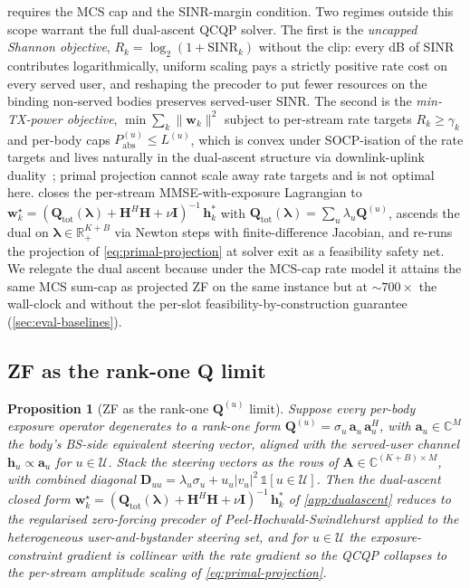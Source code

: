 \documentclass[journal,twocolumn,10pt]{IEEEtran}
\theoremstyle{plain}
\newtheorem{proposition}[theorem]{Proposition}
\theoremstyle{remark}
\newcommand{\hh}{\mathbf{h}}
\newcommand{\ww}{\mathbf{w}}
\newcommand{\Pabs}{P_{\mathrm{abs}}}
\newcommand{\Qmat}{\mathbf{Q}}
\newcommand{\HH}{\mathbf{H}}
\newcommand{\II}{\mathbf{I}}
\newcommand{\Complex}{\mathbb{C}}
\newcommand{\Served}{\mathcal{U}}
\begin{document}
 requires the MCS cap and the
SINR-margin condition. Two regimes outside this scope warrant the
full dual-ascent QCQP solver. The first is the
\emph{uncapped Shannon objective}, $R_k = \log_2(1 +
\mathrm{SINR}_k)$ without the clip: every dB of SINR contributes
logarithmically, uniform scaling pays a strictly positive rate cost
on every served user, and reshaping the precoder to put fewer
resources on the binding non-served bodies preserves served-user
SINR. The second is the \emph{min-TX-power objective}, $\min \sum_k
\|\ww_k\|^2$ subject to per-stream rate targets $R_k \geq \gamma_k$
and per-body caps $\Pabs^{(u)} \leq L^{(u)}$, which is convex
under SOCP-isation of the rate targets and lives naturally in the
dual-ascent structure via downlink-uplink duality~\cite{Wiesel2008};
primal projection cannot scale away rate targets and is not
optimal here.  closes the per-stream
MMSE-with-exposure Lagrangian to
$\ww_k^\star = (\Qmat_{\mathrm{tot}}(\bm\lambda) + \HH^H \HH +
\nu\II)^{-1}\,\hh_k^*$ with
$\Qmat_{\mathrm{tot}}(\bm\lambda) = \sum_u \lambda_u \Qmat^{(u)}$,
ascends the dual on $\bm\lambda \in \mathbb{R}_+^{K+B}$ via Newton
steps with finite-difference Jacobian, and re-runs the projection
of \cref{eq:primal-projection} at solver exit as a feasibility
safety net. We relegate the dual ascent because under the MCS-cap
rate model it attains the same MCS sum-cap as projected ZF on the
same instance but at $\sim 700\times$ the wall-clock and without
the per-slot feasibility-by-construction guarantee
(\cref{sec:eval-baselines}).

\subsection{ZF as the rank-one Q limit}\label{sec:zf-limit}

\begin{proposition}[ZF as the rank-one $\Qmat^{(u)}$ limit]\label{prop:ZFlimit}
Suppose every per-body exposure operator degenerates to a rank-one
form $\Qmat^{(u)} = \sigma_u\,\mathbf{a}_u\,\mathbf{a}_u^H$, with
$\mathbf{a}_u \in \Complex^M$ the body's BS-side equivalent steering
vector, aligned with the served-user channel
$\hh_u \propto \mathbf{a}_u$ for $u \in \Served$. Stack the
steering vectors as the rows of $\mathbf{A} \in \Complex^{(K+B)
\times M}$, with combined diagonal $\mathbf{D}_{uu} = \lambda_u
\sigma_u + u_u |v_u|^2\,\mathbb{1}[u \in \Served]$. Then the
dual-ascent closed form
$\ww_k^\star = (\Qmat_{\mathrm{tot}}(\bm\lambda) + \HH^H \HH +
\nu\II)^{-1}\,\hh_k^*$ of \cref{app:dualascent} reduces to the
regularised zero-forcing precoder of Peel-Hochwald-Swindlehurst
\cite{PeelHochwald2005} applied to the heterogeneous
user-and-bystander steering set, and for $u \in \Served$ the
exposure-constraint gradient is collinear with the rate gradient
so the QCQP collapses to the per-stream amplitude scaling of
\cref{eq:primal-projection}.
\end{proposition}
\end{document}
